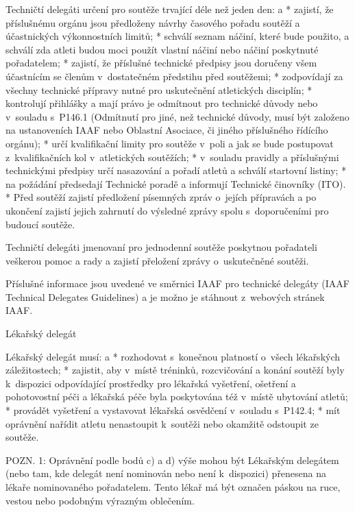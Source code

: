 Techničtí delegáti určení pro soutěže trvající déle než jeden den:
\begitems \style a
* zajistí, že příslušnému orgánu jsou předloženy návrhy časového pořadu soutěží a účastnických výkonnostních limitů;
* schválí seznam náčiní, které bude použito, a schválí zda atleti budou moci použít vlastní náčiní nebo náčiní poskytnuté pořadatelem;
* zajistí, že příslušné technické předpisy jsou doručeny všem účastnícím se členům v~dostatečném předstihu před soutěžemi;
* zodpovídají za všechny technické přípravy nutné pro uskutečnění atletických disciplín;
* kontrolují přihlášky a mají právo je odmítnout pro technické důvody nebo v~souladu s~P146.1 (Odmítnutí pro jiné, než technické důvody, musí být založeno na ustanoveních IAAF nebo Oblastní Asociace, či jiného příslušného řídícího orgánu);
* určí kvalifikační limity pro soutěže v~poli a jak se bude postupovat z~kvalifikačních kol v~atletických soutěžích;
* v~souladu pravidly a příslušnými technickými předpisy určí nasazování a pořadí atletů a schválí startovní listiny;
* na požádání předsedají Technické poradě a informují Technické činovníky (ITO).
* Před soutěží zajistí předložení písemných zpráv o~jejích přípravách a po ukončení zajistí jejich zahrnutí do výsledné zprávy spolu s~doporučeními pro budoucí soutěže.
\enditems

Techničtí delegáti jmenovaní pro jednodenní soutěže poskytnou pořadateli veškerou pomoc a rady a zajistí přeložení zprávy o~uskutečněné soutěži.

Příslušné informace jsou uvedené ve směrnici IAAF pro technické delegáty (IAAF Technical Delegates Guidelines) a je možno je stáhnout z~webových stránek IAAF.

\secc Lékařský delegát

Lékařský delegát musí:
\begitems \style a
* rozhodovat s~konečnou platností o~všech lékařských záležitostech;
* zajistit, aby v~místě tréninků, rozcvičování a konání soutěží byly k~dispozici odpovídající prostředky pro lékařská vyšetření, ošetření a pohotovostní péči a lékařská péče byla poskytována též v~místě ubytování atletů;
* provádět vyšetření a vystavovat lékařská osvědčení v~souladu s~P142.4;
* mít oprávnění nařídit atletu nenastoupit k~soutěži nebo okamžitě odstoupit ze soutěže.
\enditems

POZN. 1: Oprávnění podle bodů c) a d) výše mohou být Lékařským delegátem (nebo tam, kde delegát není nominován nebo není k~dispozici) přenesena na lékaře nominovaného pořadatelem. Tento lékař má být označen páskou na ruce, vestou nebo podobným výrazným oblečením.

